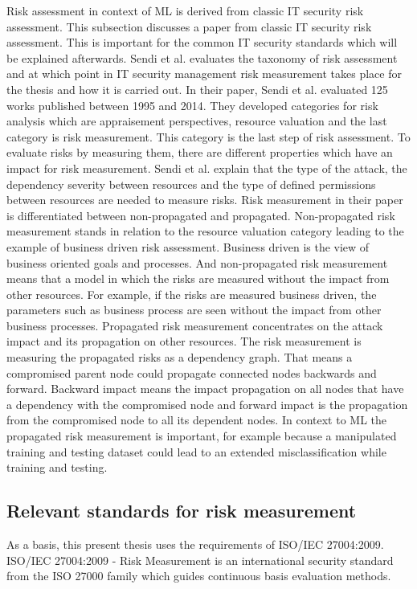 Risk assessment in context of ML is derived from classic IT security risk assessment. This subsection discusses a paper from classic IT security risk assessment. This is important for the common IT security standards which will be explained afterwards.
Sendi et al. \cite{DBLP:journals/compsec/SendiAC16} evaluates the taxonomy of risk assessment and at which point in IT security management risk measurement takes place for the thesis and
how it is carried out. In their paper, Sendi et al. evaluated 125 works published between 1995 and 2014. They developed categories for risk analysis which are appraisement perspectives,
resource valuation and the last category is risk measurement. This category is the last step of risk assessment. To evaluate risks by measuring them, there are different properties which
have an impact for risk measurement. Sendi et al. explain that the type of the attack, the dependency severity between resources and the type of defined permissions between resources are
needed to measure risks. Risk measurement in their paper is differentiated between non-propagated and propagated. Non-propagated risk measurement stands in relation to the resource
valuation category leading to the example of business driven risk assessment. Business driven is the view of business oriented goals and processes. And non-propagated risk measurement
means that a model in which the risks are measured without the impact from other resources. For example, if the risks are measured business driven, the parameters such as business process
are seen without the impact from other business processes. Propagated risk measurement concentrates on the attack impact and its propagation on other resources. The risk measurement is
measuring the propagated risks as a dependency graph. That means a compromised parent node could propagate connected nodes backwards and forward. Backward impact means the impact
propagation on all nodes that have a dependency with the compromised node and forward impact is the propagation from the compromised node to all its dependent nodes. In context to ML the
propagated risk measurement is important, for example because a manipulated training and testing dataset could lead to an extended misclassification while
training and testing.

\subsection{Relevant standards for risk measurement}

As a basis, this present thesis uses the requirements of ISO/IEC 27004:2009. ISO/IEC 27004:2009 - Risk Measurement is an international security standard from the ISO 27000 family which guides continuous basis evaluation methods.

